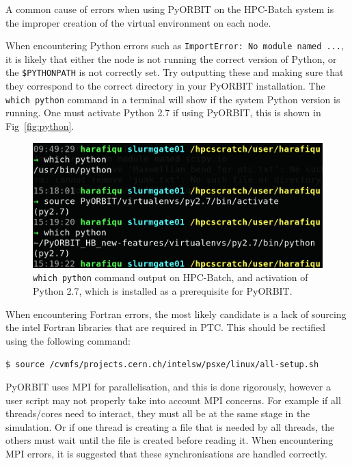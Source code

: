 \documentclass[a4paper]{cernatsnote}
\begin{document}
A common cause of errors when using PyORBIT on the HPC-Batch system is the improper creation of the virtual environment on each node. 

When encountering Python errors such as \texttt{ImportError: No module named ...}, it is likely that either the node is not running the correct version of Python, or the \texttt{\$PYTHONPATH} is not correctly set. Try outputting these and making sure that they correspond to the correct directory in your PyORBIT installation. The \texttt{which python} command in a terminal will show if the system Python version is running. One must activate Python 2.7 if using PyORBIT, this is shown in Fig~\ref{fig:python}.

\begin{figure}		
	\centering
	\includegraphics[width=0.8\columnwidth]{python.png}
	\caption{\texttt{which python} command output on HPC-Batch, and activation of Python 2.7, which is installed as a prerequisite for PyORBIT.}
	\label{fig:sinfo}
\end{figure}

When encountering Fortran errors, the most likely candidate is a lack of sourcing the intel Fortran libraries that are required in PTC. This should be rectified using the following command:
\begin{lstlisting}[language=bash, belowskip=-3\medskipamount]
$ source /cvmfs/projects.cern.ch/intelsw/psxe/linux/all-setup.sh
\end{lstlisting}

PyORBIT uses MPI for parallelisation, and this is done rigorously, however a user script may not properly take into account MPI concerns. For example if all threads/cores need to interact, they must all be at the same stage in the simulation. Or if one thread is creating a file that is needed by all threads, the others must wait until the file is created before reading it. When encountering MPI errors, it is suggested that these synchronisations are handled correctly.

\end{document}
